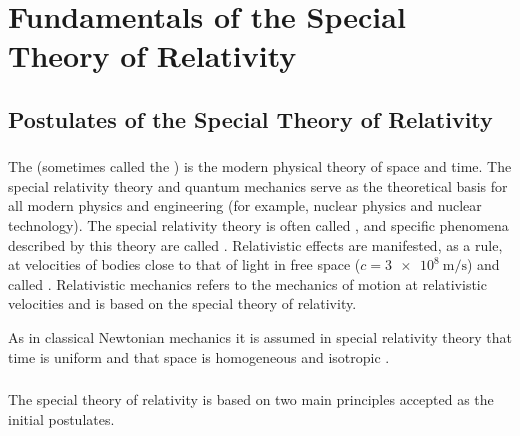 

\chapter{Fundamentals of the Special Theory of Relativity}
\label{ch-05}

\section{Postulates of the Special Theory of Relativity}
\label{sec-5.1}
\subsection{}\label{5.1.1} The  (sometimes called the ) is the modern physical theory of space and time. The special relativity theory and quantum mechan­ics  serve as the theoretical basis for all modern physics and engineering (for example, nuclear physics and nuclear technology). The special relativity theory is often called , and specific phenomena described by this theory
are called . Relativistic effects are manifested, as a rule, at velocities of bodies close to that of light in free space ($c = \SI{3e8}{\meter\per\second}$) and called . Relati­vistic mechanics refers to the mechanics of motion at relativistic velocities and is based on the special theory of relativity.

As in classical Newtonian mechanics it is assumed in special relativity theory that time is uniform  and that space is homogeneous  and isotropic .

\subsection{}\label{5.1.2} The special theory of relativity is based on two main principles accepted as the initial postulates.

